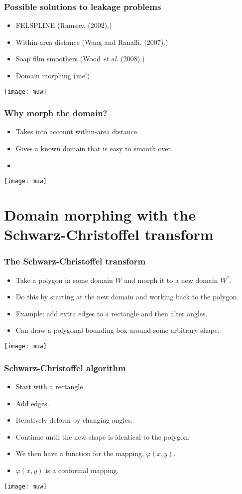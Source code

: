 \documentclass[ignorenonframetext]{beamer} %
\newcommand{\bc}{\begin{center}}
\newcommand{\ec}{\end{center}}
\newcommand{\bi}{\begin{itemize}}
\newcommand{\ei}{\end{itemize}}
\begin{document}
\begin{frame}
	\frametitle{Possible solutions to leakage problems}
       \bi
         \item FELSPLINE (Ramsay, (2002).)
         \item Within-area distance (Wang and Ranalli. (2007).)
         \item Soap film smoothers (Wood \emph{et al.} (2008).) 
         \item Domain morphing (me!)
        \ei
        \bc
              \texttt{[image: muw]}
       \ec
\end{frame}

\begin{frame}
	\frametitle{Why morph the domain?}
       \bi
         \item Takes into account within-area distance.
         \item Gives a known domain that is easy to smooth over.
         \item  
        \ei
        \bc
              \texttt{[image: muw]}
       \ec
\end{frame}


\section{Domain morphing with the Schwarz-Christoffel transform}

\begin{frame}
	\frametitle{The Schwarz-Christoffel transform}
       \bi
         \item Take a polygon in some domain $W$ and morph it to a new domain $W^*$.
         \item Do this by starting at the new domain and working back to the polygon.
         \item Example: add extra edges to a rectangle and then alter angles.
         \item Can draw a polygonal bounding box around some arbitrary shape.
        \ei
        \bc
              \texttt{[image: muw]}
       \ec
\end{frame}


\begin{frame}
	\frametitle{Schwarz-Christoffel algorithm}
       \bi
         \item Start with a rectangle.
         \item Add edges.
         \item Iteratively deform by changing angles.
         \item Continue until the new shape is identical to the polygon.
         \item We then have a function for the mapping, $\varphi(x,y)$.
         \item $\varphi(x,y)$ is a conformal mapping.
        \ei 
        \bc
              \texttt{[image: muw]}
       \ec
\end{frame}
\end{document}
